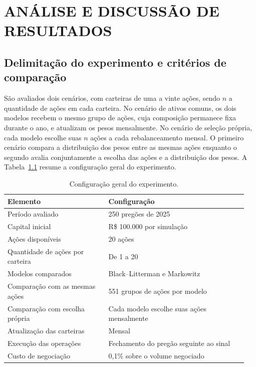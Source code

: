 \chapter{ANÁLISE E DISCUSSÃO DE RESULTADOS}
\label{cap:resultados}
\renewcommand{\thetable}{\thechapter.\arabic{table}}
\renewcommand{\thefigure}{\thechapter.\arabic{figure}}
\setcounter{table}{0}\setcounter{figure}{0}
\section{Delimitação do experimento e critérios de comparação}
São avaliados dois cenários, com carteiras de uma a vinte ações,
sendo $n$ a quantidade de ações em cada carteira. No cenário de
ativos comuns, os dois modelos recebem o mesmo grupo de ações,
cuja composição permanece fixa durante o ano, e atualizam os
pesos mensalmente. No cenário de seleção própria, cada modelo
escolhe suas $n$ ações a cada rebalanceamento mensal. O primeiro
cenário compara a distribuição dos pesos entre as mesmas ações enquanto
o segundo avalia conjuntamente a escolha das ações e a
distribuição dos pesos. A Tabela~\ref{tab:configuracao_experimento}
resume a configuração geral do experimento.

\begin{table}[H]
\centering
\caption{Configuração geral do experimento.}
\label{tab:configuracao_experimento}
{\footnotesize
\renewcommand{\arraystretch}{0.85}
\begin{tabular}{p{0.40\linewidth}p{0.55\linewidth}}
\hline
Elemento & Configuração \\ \hline
Período avaliado & 250 pregões de 2025 \\
Capital inicial & R\$ 100.000 por simulação \\
Ações disponíveis & 20 ações \\
Quantidade de ações por carteira & De 1 a 20 \\
Modelos comparados & Black--Litterman e Markowitz \\
Comparação com as mesmas ações & 551 grupos de ações por modelo \\
Comparação com escolha própria & Cada modelo escolhe suas ações mensalmente \\
Atualização das carteiras & Mensal \\
Execução das operações & Fechamento do pregão seguinte ao sinal \\
Custo de negociação & 0,1\% sobre o volume negociado \\
\hline
\end{tabular}}
\par{}
\end{table}

